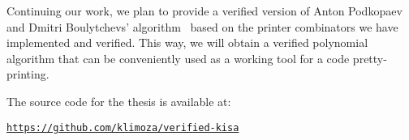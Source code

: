 \documentclass[14pt]{constructor-diploma}
\begin{document}
Continuing our work, we plan to provide a verified version of Anton Podkopaev and Dmitri Boulytchevs' algorithm~\cite{podkopaev} based on the printer combinators we have implemented and verified. 
This way, we will obtain a verified polynomial algorithm that can be conveniently used as a working tool for a code pretty-printing.

The source code for the thesis is available at:
\begin{center}
    \href{https://github.com/klimoza/verified-kisa}{\texttt{https://github.com/klimoza/verified-kisa}}
\end{center}

\setmonofont[Mapping=tex-text]{CMU Typewriter Text}
% 
% 
\printbibliography
\end{document}
